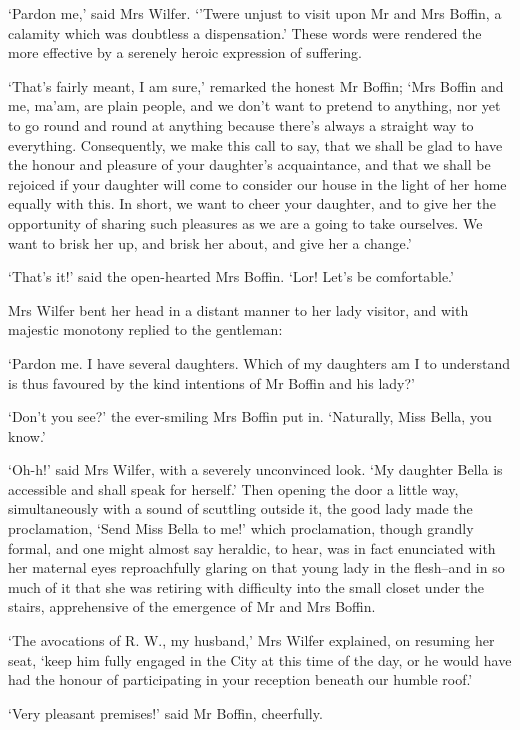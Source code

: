 ‘Pardon me,’ said Mrs Wilfer. ‘’Twere unjust to visit upon Mr and Mrs
Boffin, a calamity which was doubtless a dispensation.’ These words
were rendered the more effective by a serenely heroic expression of
suffering.

‘That’s fairly meant, I am sure,’ remarked the honest Mr Boffin; ‘Mrs
Boffin and me, ma’am, are plain people, and we don’t want to pretend
to anything, nor yet to go round and round at anything because there’s
always a straight way to everything. Consequently, we make this call
to say, that we shall be glad to have the honour and pleasure of your
daughter’s acquaintance, and that we shall be rejoiced if your daughter
will come to consider our house in the light of her home equally with
this. In short, we want to cheer your daughter, and to give her
the opportunity of sharing such pleasures as we are a going to take
ourselves. We want to brisk her up, and brisk her about, and give her a
change.’

‘That’s it!’ said the open-hearted Mrs Boffin. ‘Lor! Let’s be
comfortable.’

Mrs Wilfer bent her head in a distant manner to her lady visitor, and
with majestic monotony replied to the gentleman:

‘Pardon me. I have several daughters. Which of my daughters am I to
understand is thus favoured by the kind intentions of Mr Boffin and his
lady?’

‘Don’t you see?’ the ever-smiling Mrs Boffin put in. ‘Naturally, Miss
Bella, you know.’

‘Oh-h!’ said Mrs Wilfer, with a severely unconvinced look. ‘My daughter
Bella is accessible and shall speak for herself.’ Then opening the door
a little way, simultaneously with a sound of scuttling outside it,
the good lady made the proclamation, ‘Send Miss Bella to me!’ which
proclamation, though grandly formal, and one might almost say heraldic,
to hear, was in fact enunciated with her maternal eyes reproachfully
glaring on that young lady in the flesh--and in so much of it that she
was retiring with difficulty into the small closet under the stairs,
apprehensive of the emergence of Mr and Mrs Boffin.

‘The avocations of R. W., my husband,’ Mrs Wilfer explained, on resuming
her seat, ‘keep him fully engaged in the City at this time of the day,
or he would have had the honour of participating in your reception
beneath our humble roof.’

‘Very pleasant premises!’ said Mr Boffin, cheerfully.

